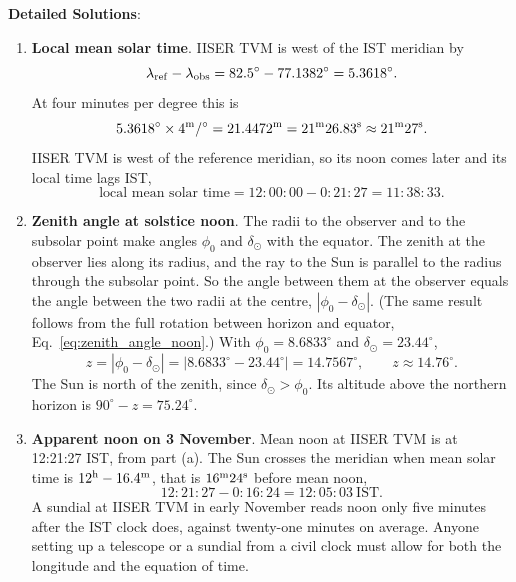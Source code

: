 \textbf{Detailed Solutions}:
\begin{enumerate}[label=(\alph*)]
	\item \textbf{Local mean solar time}. IISER TVM is west of the IST meridian by
	\[
	\lambda_{\rm ref} - \lambda_{\rm obs} = 82.5^\circ - 77.1382^\circ = 5.3618^\circ .
	\]
	At four minutes per degree this is
	\[
	5.3618^\circ \times 4^{\rm m}/^\circ = 21.4472^{\rm m} = 21^{\rm m}26.83^{\rm s} \approx 21^{\rm m}27^{\rm s}.
	\]
	IISER TVM is west of the reference meridian, so its noon comes later and its local time lags IST,
	\[
	\boxed{\text{local mean solar time} = 12{:}00{:}00 - 0{:}21{:}27 = 11{:}38{:}33.}
	\]

	\item \textbf{Zenith angle at solstice noon}. The radii to the observer and to the subsolar point make angles $\phi_0$ and $\delta_\odot$ with the equator. The zenith at the observer lies along its radius, and the ray to the Sun is parallel to the radius through the subsolar point. So the angle between them at the observer equals the angle between the two radii at the centre, $|\phi_0-\delta_\odot|$. (The same result follows from the full rotation between horizon and equator, Eq.~\eqref{eq:zenith_angle_noon}.) With $\phi_0 = 8.6833^\circ$ and $\delta_\odot = 23.44^\circ$,
	\[
	z = |\phi_0 - \delta_\odot| = |8.6833^\circ - 23.44^\circ| = 14.7567^\circ, \qquad \boxed{z\approx 14.76^\circ.}
	\]
	The Sun is north of the zenith, since $\delta_\odot>\phi_0$. Its altitude above the northern horizon is $90^\circ - z = 75.24^\circ$.

	\item \textbf{Apparent noon on 3 November}. Mean noon at IISER TVM is at 12:21:27 IST, from part (a). The Sun crosses the meridian when mean solar time is $12^{\rm h}-16.4^{\rm m}$, that is $16^{\rm m}24^{\rm s}$ before mean noon,
	\[
	\boxed{12{:}21{:}27-0{:}16{:}24=12{:}05{:}03\ \text{IST}.}
	\]
	A sundial at IISER TVM in early November reads noon only five minutes after the IST clock does, against twenty-one minutes on average. Anyone setting up a telescope or a sundial from a civil clock must allow for both the longitude and the equation of time.
\end{enumerate}
